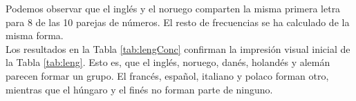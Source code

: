 \documentclass[a4paper, 20pt]{article}
\begin{document}
\begin{table}[h]
\caption{Ejemplo \ref{ej:leng}. Concordancia de la primera letra para 10 números en 11 lenguajes.}
\label{tab:lengConc}
\centering
{}
\end{table}
 
Podemos observar que el inglés y el noruego comparten la misma primera letra para 8 de las 10 parejas de números. El resto de frecuencias se ha calculado de la misma forma.\\
Los resultados en la Tabla \ref{tab:lengConc} confirman la impresión visual inicial de la Tabla \ref{tab:leng}. Esto es, que el inglés, noruego, danés, holandés y alemán parecen formar un grupo. El francés, español, italiano y polaco forman otro, mientras que el húngaro y el finés no forman parte de ninguno.\\
\end{document}
